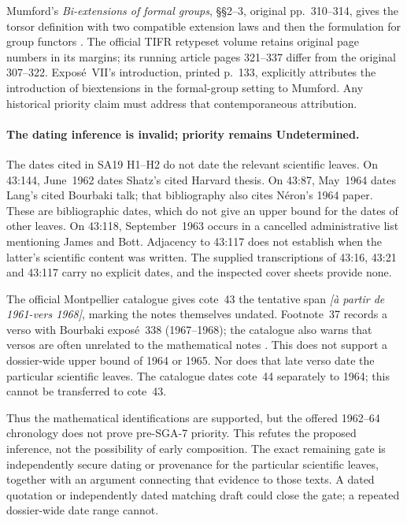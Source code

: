 Mumford's \emph{Bi-extensions of formal groups}, \S\S2--3,
original pp.~310--314, gives the torsor definition with two compatible
extension laws and then the formulation for group functors
\cite{Mumford1969}. The official TIFR retypeset volume retains
original page numbers in its margins; its running article pages
321--337 differ from the original 307--322. Expos\'e~VII's introduction,
printed p.~133, explicitly attributes the introduction of
biextensions in the formal-group setting to Mumford. Any historical
priority claim must address that contemporaneous attribution.

\paragraph{The dating inference is invalid; priority remains Undetermined.}
The dates cited in SA19 H1--H2 do not date the relevant scientific
leaves. On 43:144, June~1962 dates Shatz's cited Harvard thesis.
On 43:87, May~1964 dates Lang's cited Bourbaki talk; that bibliography
also cites N\'eron's 1964 paper. These are bibliographic dates,
which do not give an upper bound for the dates of other leaves.
On 43:118, September~1963 occurs in a cancelled administrative list
mentioning James and Bott. Adjacency to 43:117 does not establish
when the latter's scientific content was written. The supplied
transcriptions of 43:16, 43:21 and 43:117 carry no explicit dates,
and the inspected cover sheets provide none.

The official Montpellier catalogue gives cote~43 the tentative span
\emph{[à partir de 1961-vers 1968]}, marking the notes themselves
undated. Footnote~37 records a verso with Bourbaki exposé~338
(1967--1968); the catalogue also warns that versos are often
unrelated to the mathematical notes \cite{MontpellierCatalogue}.
This does not support a dossier-wide upper bound of 1964 or 1965.
Nor does that late verso date the particular scientific leaves.
The catalogue dates cote~44 separately to 1964; this cannot be
transferred to cote~43.

Thus the mathematical identifications are supported, but the offered
1962--64 chronology does not prove pre-SGA-7 priority. This refutes
the proposed inference, not the possibility of early composition.
The exact remaining gate is independently secure dating or provenance
for the particular scientific leaves, together with an argument
connecting that evidence to those texts. A dated quotation or
independently dated matching draft could close the gate; a repeated
dossier-wide date range cannot.

